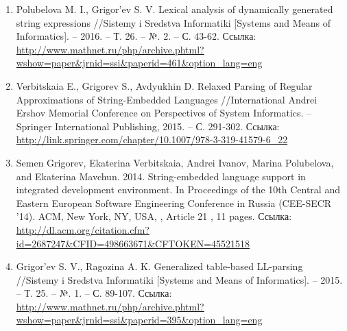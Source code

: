 \documentclass[12pt]{article}  %
\theoremstyle{remark}
\begin{document}
\begin{enumerate}
\item Polubelova M. I., Grigor'ev S. V. Lexical analysis of dynamically generated string expressions //Sistemy i Sredstva Informatiki [Systems and Means of Informatics]. – 2016. – Т. 26. – №. 2. – С. 43-62.
Ссылка: \url{http://www.mathnet.ru/php/archive.phtml?wshow=paper&jrnid=ssi&paperid=461&option_lang=eng}

\item Verbitskaia E., Grigorev S., Avdyukhin D. Relaxed Parsing of Regular Approximations of String-Embedded Languages //International Andrei Ershov Memorial Conference on Perspectives of System Informatics. – Springer International Publishing, 2015. – С. 291-302.
Ссылка: \url{http://link.springer.com/chapter/10.1007/978-3-319-41579-6_22}

\item Semen Grigorev, Ekaterina Verbitskaia, Andrei Ivanov, Marina Polubelova, and Ekaterina Mavchun. 2014. String-embedded language support in integrated development environment. In Proceedings of the 10th Central and Eastern European Software Engineering Conference in Russia (CEE-SECR '14). ACM, New York, NY, USA, , Article 21 , 11 pages.
Ссылка: \url{http://dl.acm.org/citation.cfm?id=2687247&CFID=498663671&CFTOKEN=45521518}

\item Grigor'ev S. V., Ragozina A. K. Generalized table-based LL-parsing //Sistemy i Sredstva Informatiki [Systems and Means of Informatics]. – 2015. – Т. 25. – №. 1. – С. 89-107.
Ссылка: \url{http://www.mathnet.ru/php/archive.phtml?wshow=paper&jrnid=ssi&paperid=395&option_lang=eng}

\end{enumerate}
\end{document}
